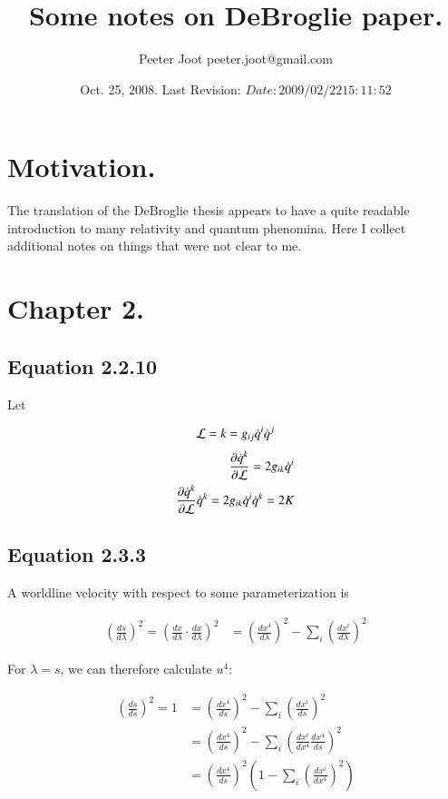 \documentclass{article}
\title{Some notes on DeBroglie paper.}
\author{Peeter Joot \quad peeter.joot@gmail.com}
\date{ Oct. 25, 2008.  Last Revision: $Date: 2009/02/22 15:11:52 $ }
\begin{document}
\maketitle{}

\section{ Motivation. }

The translation of the DeBroglie thesis \cite{AFkracklauerDeBroglie}
appears to have a quite readable introduction to many relativity and 
quantum phenomina.  Here I collect additional notes on things that were
not clear to me.

\section{ Chapter 2. }

\subsection{Equation 2.2.10}

Let 

\begin{align*}
\mathcal{L} = k = g_{ij} \dot{q}^i \dot{q}^j
\end{align*}
\begin{align*}
\frac{\partial{\dot{q}^k}}{\partial {\mathcal{L}}} = 2 g_{ik} \dot{q}^i \\
\frac{\partial{\dot{q}^k}}{\partial {\mathcal{L}}} \dot{q}^k = 2 g_{ik} \dot{q}^i \dot{q}^k = 2 K
\end{align*}


\subsection{Equation 2.3.3}

A worldline velocity with respect to some parameterization is

\begin{align*}
\left(\frac{ds}{d\lambda}\right)^2 = \left( \frac{dx}{d\lambda} \cdot \frac{dx}{d\lambda} \right)^2
&= \left(\frac{dx^4}{d\lambda}\right)^2 - \sum_i \left(\frac{dx^i}{d\lambda}\right)^2
\end{align*}

For $\lambda = s$, we can therefore calculate $u^4$:

\begin{align*}
\left(\frac{ds}{ds}\right)^2 = 1 
&= \left(\frac{dx^4}{ds}\right)^2 - \sum_i \left(\frac{dx^i}{ds}\right)^2 \\
&= \left(\frac{dx^4}{ds}\right)^2 - \sum_i \left( \frac{dx^i}{dx^4} \frac{dx^4}{ds} \right)^2 \\
&= \left(\frac{dx^4}{ds}\right)^2 \left( 1 - \sum_i \left( \frac{dx^i}{dx^4} \right)^2 \right) \\
\end{align*}
\end{document}
